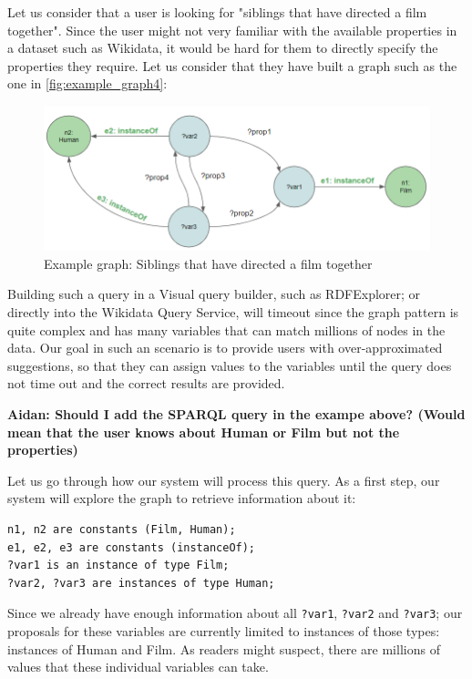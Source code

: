 \begin{example}

Let us consider that a user is looking for "siblings that have directed a film together". 
Since the user might not very familiar with the available properties in a dataset such as Wikidata, it would be hard for them to directly specify the properties they require. Let us consider that they have built a graph such as the one in \autoref{fig:example_graph4}:

\begin{figure}[H]
    \centering
        \includegraphics[width=\linewidth]{imagenes/ExampleGraph1.png}
        \caption{Example graph: Siblings that have directed a film together}
        \label{fig:example_graph4}
\end{figure}

Building such a query in a Visual query builder, such as RDFExplorer; or directly into the Wikidata Query Service, will timeout since the graph pattern is quite complex and has many variables that can match millions of nodes in the data. Our goal in such an scenario is to provide users with over-approximated suggestions, so that they can assign values to the variables until the query does not time out and the correct results are provided.

\textbf{Aidan: Should I add the SPARQL query in the exampe above? (Would mean that the user knows about Human or Film but not the properties)}

Let us go through how our system will process this query. 
As a first step, our system will explore the graph to retrieve information about it:
\begin{verbatim}
n1, n2 are constants (Film, Human);
e1, e2, e3 are constants (instanceOf);
?var1 is an instance of type Film;
?var2, ?var3 are instances of type Human;
\end{verbatim}

Since we already have enough information about all \texttt{?var1}, \texttt{?var2} and \texttt{?var3}; our proposals for these variables are currently limited to instances of those types: instances of Human and Film. As readers might suspect, there are millions of values that these individual variables can take. 


\end{example}
